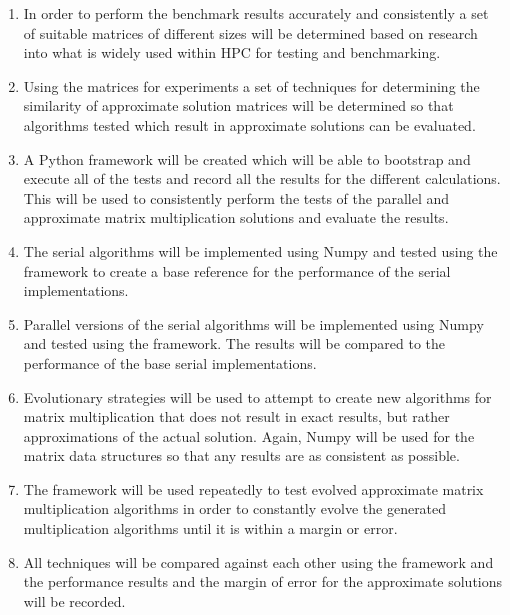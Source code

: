 \documentclass{article}
\begin{document}
\begin{enumerate}
\item In order to perform the benchmark results accurately and consistently a set of suitable matrices of different sizes will be determined based on research into what is widely used within HPC for testing and benchmarking.

\item Using the matrices for experiments a set of techniques for determining the similarity of approximate solution matrices will be determined so that algorithms tested which result in approximate solutions can be evaluated.

\item A Python framework will be created which will be able to bootstrap and execute all of the tests and record all the results for the different calculations. This will be used to consistently perform the tests of the parallel and approximate matrix multiplication solutions and evaluate the results.

\item The serial algorithms will be implemented using Numpy and tested using the framework to create a base reference for the performance of the serial implementations.

\item Parallel versions of the serial algorithms will be implemented using Numpy and tested using the framework. The results will be compared to the performance of the base serial implementations.

\item Evolutionary strategies will be used to attempt to create new algorithms for matrix multiplication that does not result in exact results, but rather approximations of the actual solution. Again, Numpy will be used for the matrix data structures so that any results are as consistent as possible.

\item The framework will be used repeatedly to test evolved approximate matrix multiplication algorithms in order to constantly evolve the generated multiplication algorithms until it is within a margin or error.

\item All techniques will be compared against each other using the framework and the performance results and the margin of error for the approximate solutions will be recorded.
\end{enumerate}




\end{document}
